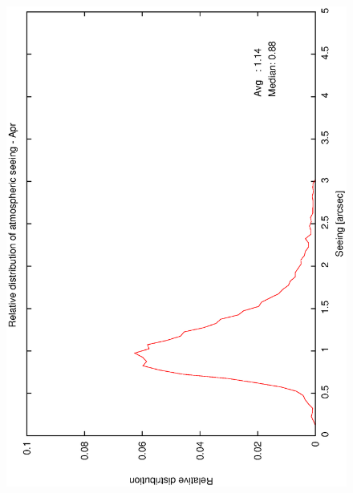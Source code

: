 {{\begin{figure}[htbp]
\begin{center}
{   \includegraphics[scale=0.25, angle=-90]{figures/ecs/corr_see_dist_apr.eps}
  }
 \subfigure[] {
   \label{fig:see_dist_may}
}
\end{center}
\end{figure}}}
